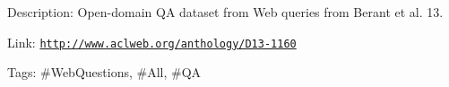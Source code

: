 Description\+: Open-\/domain QA dataset from Web queries from Berant et al. \textquotesingle{}13.

Link\+: \href{http://www.aclweb.org/anthology/D13-1160}{\tt http\+://www.\+aclweb.\+org/anthology/\+D13-\/1160}

Tags\+: \#\+Web\+Questions, \#\+All, \#\+QA 